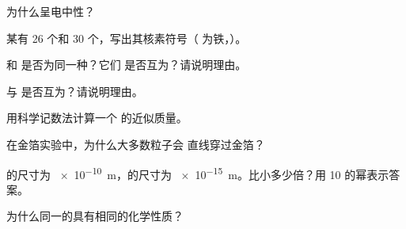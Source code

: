 \begin{exercise}[$\star$]\label{exo:g9:inside-the-atom:3}
为什么呈电中性？
\end{exercise}

\begin{exercise}[$\star$]\label{exo:g9:inside-the-atom:4}
某有 26 个和 30 个，写出其核素符号（
为铁，）。
\end{exercise}

\begin{exercise}[$\star\star$]\label{exo:g9:inside-the-atom:5}
 和  是否为同一种？它们
是否互为？请说明理由。
\end{exercise}

\begin{exercise}[$\star\star$]\label{exo:g9:inside-the-atom:6}
 与  是否互为？请说明理由。
\end{exercise}

\begin{exercise}[$\star\star$]\label{exo:g9:inside-the-atom:7}
用科学记数法计算一个
 的近似质量。
\end{exercise}

\begin{exercise}[$\star\star$]\label{exo:g9:inside-the-atom:8}
在金箔实验中，为什么大多数粒子会
直线穿过金箔？
\end{exercise}

\begin{exercise}[$\star\star$]\label{exo:g9:inside-the-atom:9}
的尺寸为 \qty{e-10}{m}，的尺寸为
\qty{e-15}{m}。比小多少倍？用 10 的幂表示答案。
\end{exercise}

\begin{exercise}[$\star\star$]\label{exo:g9:inside-the-atom:10}
为什么同一的具有相同的化学性质？
\end{exercise}

